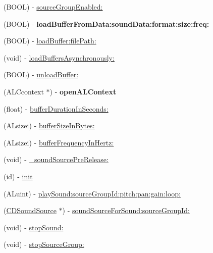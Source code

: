 \begin{DoxyCompactItemize}
\item 
(B\+O\+OL) -\/ \hyperlink{interfaceCDSoundEngine_a9e73b1f9ce070579469e18da0fdabf5a}{source\+Group\+Enabled\+:}
\item 
\mbox{\label{interfaceCDSoundEngine_ad55fe00fbd360d99e3832047dc6f668c}} 
(B\+O\+OL) -\/ {\bfseries load\+Buffer\+From\+Data\+:sound\+Data\+:format\+:size\+:freq\+:}
\item 
(B\+O\+OL) -\/ \hyperlink{interfaceCDSoundEngine_a6b28868545d700c3cc40d087527c6012}{load\+Buffer\+:file\+Path\+:}
\item 
(void) -\/ \hyperlink{interfaceCDSoundEngine_a8ab83905d8865c75c8055871f5c84fdd}{load\+Buffers\+Asynchronously\+:}
\item 
(B\+O\+OL) -\/ \hyperlink{interfaceCDSoundEngine_a2a245d09bd9aa88de752c97dd889662e}{unload\+Buffer\+:}
\item 
\mbox{\label{interfaceCDSoundEngine_a3207754d8ae7d5a63dc03fd43b698d12}} 
(A\+L\+Ccontext $\ast$) -\/ {\bfseries open\+A\+L\+Context}
\item 
(float) -\/ \hyperlink{interfaceCDSoundEngine_a5731f4ec2052eb323ba1777f72c9da8c}{buffer\+Duration\+In\+Seconds\+:}
\item 
(A\+Lsizei) -\/ \hyperlink{interfaceCDSoundEngine_a91672bece24f10760d62cce27986573e}{buffer\+Size\+In\+Bytes\+:}
\item 
(A\+Lsizei) -\/ \hyperlink{interfaceCDSoundEngine_af8559b48f34ad22ba9a7cf27ffcb8648}{buffer\+Frequency\+In\+Hertz\+:}
\item 
(void) -\/ \hyperlink{interfaceCDSoundEngine_ad05b4a121e37fe36d3df453989be82af}{\+\_\+sound\+Source\+Pre\+Release\+:}
\item 
(id) -\/ \hyperlink{interfaceCDSoundEngine_a013cb9b6cf86c0dbfca8fac6aae0bd6a}{init}
\item 
(A\+Luint) -\/ \hyperlink{interfaceCDSoundEngine_a03aee643e250635e2594e5ced4fbe7b2}{play\+Sound\+:source\+Group\+Id\+:pitch\+:pan\+:gain\+:loop\+:}
\item 
(\hyperlink{interfaceCDSoundSource}{C\+D\+Sound\+Source} $\ast$) -\/ \hyperlink{interfaceCDSoundEngine_ab0c372cb85df05a4070b8f8bd2213efd}{sound\+Source\+For\+Sound\+:source\+Group\+Id\+:}
\item 
(void) -\/ \hyperlink{interfaceCDSoundEngine_ae2bbd23eefecd32afcf6bc0109b5e7a2}{stop\+Sound\+:}
\item 
(void) -\/ \hyperlink{interfaceCDSoundEngine_a5d6fbd530895fac2ce486a478e46fb23}{stop\+Source\+Group\+:}

\end{DoxyCompactItemize}

